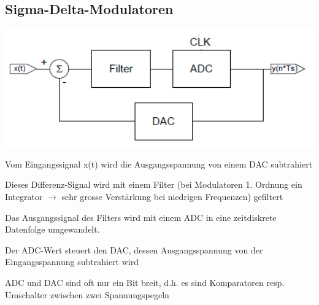 \subsection{Sigma-Delta-Modulatoren}
\begin{minipage}{0.55\textwidth}
    \includegraphics[width=1.0\textwidth]{images/AufbauSigmaDeltaModulator}
    \begin{compactitem}
        \item Vom Eingangssignal x(t) wird die Ausgangsspannung von einem DAC subtrahiert
        \item Dieses Differenz-Signal wird mit einem Filter (bei Modulatoren 1. Ordnung ein Integrator $\rightarrow$ sehr grosse Verstärkung bei niedrigen Frequenzen) gefiltert
    \end{compactitem}
\end{minipage}
\hfill
\begin{minipage}{0.40\textwidth}
    \begin{compactitem}
        \item Das Ausgangssignal des Filters wird mit einem ADC in eine zeitdiskrete Datenfolge umgewandelt. \item Der ADC-Wert steuert den DAC, dessen Ausgangsspannung von der Eingangsspannung subtrahiert wird
        \item ADC und DAC sind oft nur ein Bit breit, d.h. es sind Komparatoren resp. Umschalter zwischen zwei Spannungspegeln
    \end{compactitem}
\end{minipage}
\newpage
